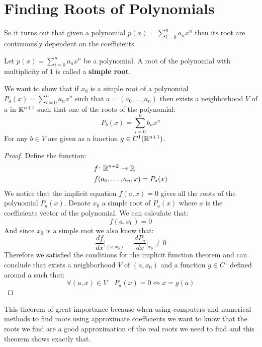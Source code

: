 \documentclass[11pt,a4paper]{article}
\begin{document}
\section{Finding Roots of Polynomials}
So it turns out that given a polynomial $p(x) = \sum_{i=0}^{n}{a_n x^n}$
then its root are continuously dependent on the coefficients.
\begin{definition}
  Let $p(x) = \sum_{i=0}^{n}{a_n x^n}$ be a polynomial. A root of the
  polynomial with multiplicity of $1$ is called a \textbf{simple root}.
\end{definition}
We want to show that if $x_0$ is a simple root of a polynomial 
$P_a(x) = \sum_{i=0}^{n}{a_n x^n}$ such that $a = (a_0,\dots,a_n)$
then exists a neighborhood $V$ of $a$ in $\mathbb{R}^{n+1}$ such that one of the
roots of the polynomial:
\[
  P_b(x) = \sum_{i=0}^{n}{b_n x^n}
\]
For any $b \in V$ are given as a function $g \in C^1(\mathbb{R}^{n+1})$.
\begin{proof}
  Define the function:
  \begin{align*}
    &f \colon \mathbb{R}^{n + 2} \to \mathbb{R} \\
    &f(a_0,\dots,a_n,x) = P_a(x)
  \end{align*}
  We notice that the implicit equation $f(a,x) = 0$ gives all the roots
  of the polynomial $P_a(x)$. Denote $x_0$ a simple root of $P_a(x)$
  where $a$ is the coefficients vector of the polynomial. We
  can calculate that:
  \[
    f(a,x_0) = 0
  \]
  And since $x_0$ is a simple root we also know that:
  \[
    \frac{df}{dx}\biggr\vert_{(a,x_0)} = 
    \frac{dP_{a}}{dx}\biggr\vert_{x_0} \neq 0 
  \]
  Therefore we satisfied the conditions for the implicit function
  theorem and can conclude that exists a neighborhood $V$ of $(a,x_0)$
  and a function $g \in C^1$ defined around $a$ such that:
  \[
    \forall (a,x) \in V \quad P_a(x) = 0 \iff x = g(a)
  \]
\end{proof}
This theorem of great importance because when using computers and 
numerical methods to find roots using approximate coefficients we want
to know that the roots we find are a good approximation of the real
roots we need to find and this theorem shows exactly that.

\newpage
\end{document}
